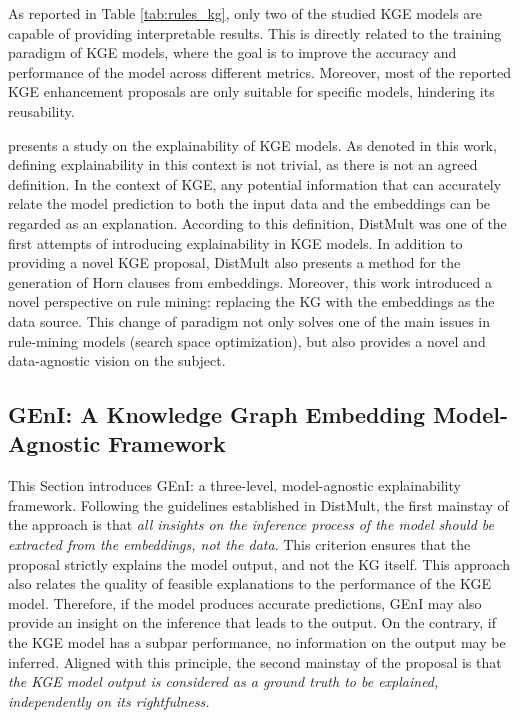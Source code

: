 As reported in Table \ref{tab:rules_kg}, only two of the studied KGE models are capable of providing interpretable results. This is directly related to the training paradigm of KGE models, where the goal is to improve the accuracy and performance of the model across different metrics. Moreover, most of the reported KGE enhancement proposals are only suitable for specific models, hindering its reusability.

\cite{bianchi_kge_explainability_2020} presents a study on the explainability of KGE models. As denoted in this work, defining explainability in this context is not trivial, as there is not an agreed definition. In the context of KGE, any potential information that can accurately relate the model prediction to both the input data and the embeddings can be regarded as an explanation. According to this definition, DistMult \citep{distmult} was one of the first attempts of introducing explainability in KGE models. In addition to providing a novel KGE proposal, DistMult also presents a method for the generation of Horn clauses from embeddings. Moreover, this work introduced a novel perspective on rule mining: replacing the KG with the embeddings as the data source. This change of paradigm not only solves one of the main issues in rule-mining models (search space optimization), but also provides a novel and data-agnostic vision on the subject.

\subsection{GEnI: A Knowledge Graph Embedding Model-Agnostic Framework}\label{6_sec:subsec:geni}
This Section introduces GEnI: a three-level, model-agnostic explainability framework. Following the guidelines established in DistMult, the first mainstay of the approach is that \textit{all insights on the inference process of the model should be extracted from the embeddings, not the data}. This criterion ensures that the proposal strictly explains the model output, and not the KG itself. This approach also relates the quality of feasible explanations to the performance of the KGE model. Therefore, if the model produces accurate predictions, GEnI may also provide an insight on the inference that leads to the output. On the contrary, if the KGE model has a subpar performance, no information on the output may be inferred. Aligned with this principle, the second mainstay of the proposal is that \textit{the KGE model output is considered as a ground truth to be explained, independently on its rightfulness.}

